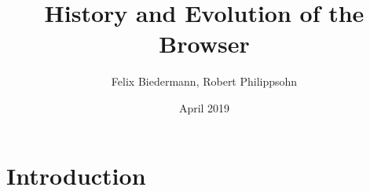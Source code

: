 \documentclass{article}
\title{History and Evolution of the Browser}
\author{Felix Biedermann, Robert Philippsohn }
\date{April 2019}
\begin{document}
\maketitle

\section{Introduction}
\end{document}
